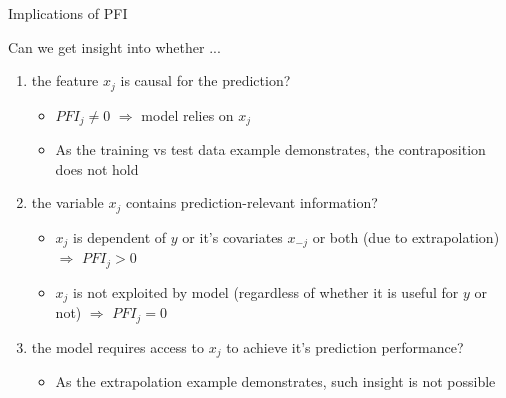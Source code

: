 \documentclass[11pt,compress,t,notes=noshow, aspectratio=169, xcolor=table]{beamer}
\begin{document}
\begin{frame}{Implications of PFI}

Can we get insight into whether ...

\begin{enumerate}
    \item<1-> the feature $x_j$ is causal for the prediction?
    \begin{itemize}
      \item $PFI_j \neq 0$ $\Rightarrow$ model relies on $x_j$
      \item As the training vs test data example demonstrates, the contraposition does not hold
    \end{itemize}
    \item<2-> the variable $x_j$ contains prediction-relevant information?
    \begin{itemize}
      \item $x_{j}$ is dependent of $y$ or it's covariates $x_{-j}$ or both (due to extrapolation) $\Rightarrow$ $PFI_j > 0$ 
      \item $x_{j}$ is not exploited by model (regardless of whether it is useful for $y$ or not) $\Rightarrow$ $PFI_j = 0$  %
    \end{itemize}
    \item<3-> the model requires access to $x_j$ to achieve it's prediction performance?    
    \begin{itemize}
      \item As the extrapolation example demonstrates, such insight is not possible
\end{itemize}
\end{enumerate}
\end{frame}
\end{document}
